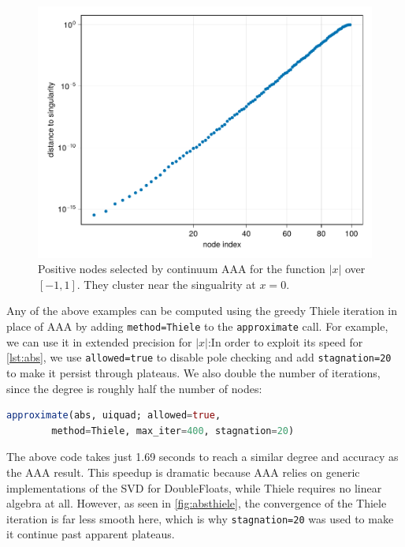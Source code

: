 \documentclass{juliacon}
\begin{document}
\begin{figure}
\centering
\includegraphics[width=\columnwidth]{absnodes.pdf}
\caption{Positive nodes selected by continuum AAA for the function $|x|$ over $[-1,1]$. They cluster near the singualrity at $x=0$.}
\label{fig:absnodes}
\end{figure}

Any of the above examples can be computed using the greedy Thiele iteration in place of AAA by adding \verb|method=Thiele| to the \verb|approximate| call. For example, we can use it in extended precision for $|x|$:In order to exploit its speed for \autoref{lst:abs}, we use \verb|allowed=true| to disable pole checking and add \verb|stagnation=20| to make it persist through plateaus. We also double the number of iterations, since the degree is roughly half the number of nodes:
\begin{lstlisting}[language = Julia, caption={Continuum Thiele for $|x|$.}]
approximate(abs, uiquad; allowed=true, 
        method=Thiele, max_iter=400, stagnation=20)
\end{lstlisting}
The above code takes just 1.69 seconds to reach a similar degree and accuracy as the AAA result. This speedup is dramatic because AAA relies on generic implementations of the SVD for \textsf{DoubleFloats}, while Thiele requires no linear algebra at all. However, as seen in \autoref{fig:absthiele}, the convergence of the Thiele iteration is far less smooth here, which is why \verb|stagnation=20| was used to make it continue past apparent plateaus.
\end{document}
